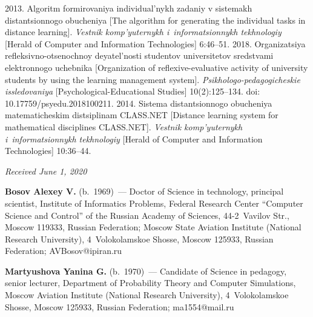 \begin{multicols}{2}
{{\begin{thebibliography}{99}
 2013. Algoritm formirovaniya individual'nykh 
zadaniy v sistemakh distantsionnogo obucheniya [The
algorithm for generating the individual tasks in distance 
learning]. \textit{Vestnik komp'yuternykh i~informatsionnykh tekhnologiy} 
[Herald of Computer and Information Technologies] 6:46--51.
 2018. Organizatsiya 
refleksivno-otsenochnoy 
deyatel'nosti studentov universitetov sredstvami elektronnogo uchebnika [Organization of 
reflexive-evaluative activity of university students by using
the learning management system]. 
\textit{Psikhologo-pedagogicheskie issledovaniya} 
[Psychological-Educational Studies] 
10(2):125--134.  doi:  10.17759/\linebreak psyedu.2018100211.
 2014. Sistema 
distantsionnogo obucheniya ma\-te\-ma\-ti\-che\-skim distsiplinam CLASS.NET [Distance learning 
system for mathematical disciplines CLASS.NET]. \textit{Vestnik komp'yuternykh 
i~informatsionnykh tekhnologiy} [Herald of Computer and Information Technologies] 10:36--44.
\end{thebibliography}

 }
 }

\end{multicols}

\vspace*{-6pt}

\hfill{\small\textit{Received June 1, 2020}}


\vspace*{-10pt}

\Contr

\vspace*{-3pt}

\noindent
\textbf{Bosov Alexey V.} (b.\ 1969)~--- Doctor of Science in technology, principal scientist, 
Institute of Informatics Problems, Federal Research Center ``Computer Science and Control'' of 
the Russian Academy of Sciences, 44-2~Vavilov Str., Moscow 119333, Russian Federation; 
Moscow State Aviation Institute (National Research University), 4~Volokolamskoe Shosse, 
Moscow 125933, Russian Federation; \mbox{AVBosov@ipiran.ru}

\vspace*{3pt}

\noindent
\textbf{Martyushova Yanina G.} (b.\ 1970)~--- Candidate of Science in pedagogy, senior 
lecturer, Department of Probability Theory and Computer Simulations, Moscow 
Aviation Institute (National Research University), 4~Volokolamskoe Shosse, Moscow 125933, 
Russian Federation; \mbox{ma1554@mail.ru}


